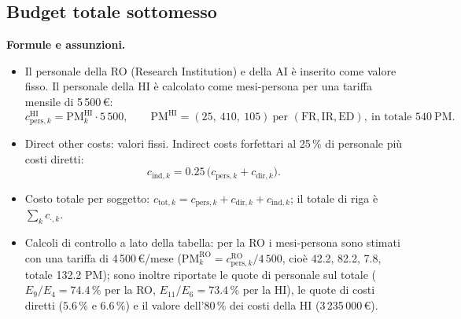 \documentclass{plan4ari_report}
\newcommand{\FR}{\mathrm{FR}}
\newcommand{\IR}{\mathrm{IR}}
\newcommand{\ED}{\mathrm{ED}}
\begin{document}
\subsection{Budget totale sottomesso}
\textbf{Formule e assunzioni.}
\begin{itemize}
  \item Il personale della RO (Research Institution) e della AI \`e inserito come valore fisso. Il personale della HI \`e calcolato come mesi-persona per una tariffa mensile di 5\,500\,\euro:
  \[
    c^{\mathrm{HI}}_{\mathrm{pers},k} = \mathrm{PM}^{\mathrm{HI}}_k \cdot 5\,500, \qquad \mathrm{PM}^{\mathrm{HI}} = (25,\ 410,\ 105)\ \text{per } (\FR,\IR,\ED),\ \text{in totale } 540\ \mathrm{PM}.
  \]
  \item Direct other costs: valori fissi. Indirect costs forfettari al 25\,\% di personale pi\`u costi diretti:
  \[ c_{\mathrm{ind},k} = 0.25\,\bigl(c_{\mathrm{pers},k} + c_{\mathrm{dir},k}\bigr). \]
  \item Costo totale per soggetto: $c_{\mathrm{tot},k} = c_{\mathrm{pers},k} + c_{\mathrm{dir},k} + c_{\mathrm{ind},k}$; il totale di riga \`e $\sum_k c_{\cdot,k}$.
  \item Calcoli di controllo a lato della tabella: per la RO i mesi-persona sono stimati con una tariffa di 4\,500\,\euro/mese ($\mathrm{PM}^{\mathrm{RO}}_k = c^{\mathrm{RO}}_{\mathrm{pers},k}/4\,500$, cio\`e 42.2, 82.2, 7.8, totale 132.2 PM); sono inoltre riportate le quote di personale sul totale ($E_9/E_4 = 74.4\,\%$ per la RO, $E_{11}/E_6 = 73.4\,\%$ per la HI), le quote di costi diretti ($5.6\,\%$ e $6.6\,\%$) e il valore dell'80\,\% dei costi della HI (3\,235\,000\,\euro).
\end{itemize}
\end{document}

